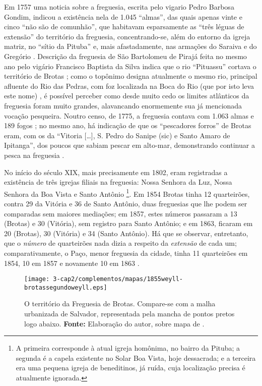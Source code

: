 Em 1757 uma noticia sobre a freguesia, escrita pelo vigario Pedro Barbosa Gondim, indicou a existência nela de 1.045 ``almas'', das quais apenas vinte e cinco ``não são de comunhão'', que habitavam esparsamente as ``três léguas de extensão'' do território da freguesia, concentrando-se, além do entorno da igreja matriz, no ``sítio da Pituba'' e, mais afastadamente, nas armações do Saraiva e do Gregório \cite[p.~183]{castralmeida_ultramar_1908}. Descrição da freguesia de São Bartolomeu de Pirajá feita no mesmo ano pelo vigário Francisco Baptista da Silva indica que o rio ``Pituassu'' cortava o território de Brotas \cite[p.~218]{castralmeida_ultramar_1908}; como o topônimo designa atualmente o mesmo rio, principal afluente do Rio das Pedras, com foz localizada na Boca do Rio (que por isto leva este nome) \cite[p.~175-177]{santos_aguas_2010}, é possível perceber como desde muito cedo os limites atlânticos da freguesia foram muito grandes, alavancando enormemente sua já mencionada vocação pesqueira. Noutro censo, de 1775, a freguesia contava com 1.063 almas e 189 fogos \cite[p.~183]{castralmeida_ultramar_1910}; no mesmo ano, há indicação de que os ``pescadores forros'' de Brotas eram, com os da ``Vitoria [\dots], S. Pedro do Sanipe (sic) e Santo Amaro de Ipitanga'', dos poucos que sabiam pescar em alto-mar, demonstrando continuar a pesca na freguesia \cite[p.~294]{castralmeida_ultramar_1910}.

No início do século XIX, mais precisamente em 1802, eram registradas a existência de três igrejas filiais na freguesia: Nossa Senhora da Luz, Nossa Senhora da Boa Vista e Santo Antônio \cite[p.~172]{VASCONCELOS2002}\footnote{A primeira corresponde à atual igreja homônima, no bairro da Pituba; a segunda é a capela existente no Solar Boa Vista, hoje dessacrada; e a terceira era uma pequena igreja de beneditinos, já ruída, cuja localização precisa é atualmente ignorada.}. Em 1854 Brotas tinha 12 quarteirões, contra 29 da Vitória e 36 de Santo Antônio, duas freguesias que lhe podem ser comparadas sem maiores mediações; em 1857, estes números passaram a 13 (Brotas) e 30 (Vitória), sem registro para Santo Antônio; e em 1863, ficaram em 20 (Brotas), 30 (Vitória) e 34 (Santo Antônio). Há que se observar, entretanto, que o \textit{número} de quarteirões nada dizia a respeito da \textit{extensão} de cada um; comparativamente, o Paço, menor freguesia da cidade, tinha 11 quarteirões em 1854, 10 em 1857 e novamente 10 em 1863 \cite[p.~46]{NASCIMENTO2007}.

\begin{sidewaysfigure}[!htp]
\texttt{[image: 3-cap2/complementos/mapas/1855weyll-brotassegundoweyll.eps]} 
\caption{O território da Freguesia de Brotas. Compare-se com a malha urbanizada de Salvador, representada pela mancha de pontos pretos logo abaixo. \textbf{Fonte:} Elaboração do autor, sobre mapa de .}
\end{sidewaysfigure}

